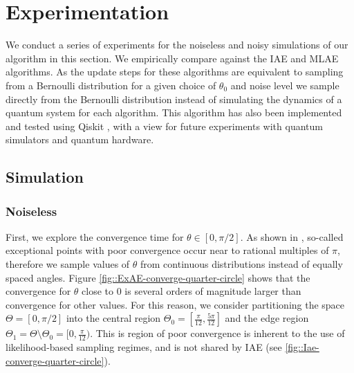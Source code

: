 \section{Experimentation}
We conduct a series of experiments for the noiseless and noisy simulations of our algorithm in this section. We empirically compare against the IAE and MLAE algorithms. As the update steps for these algorithms are equivalent to sampling from a Bernoulli distribution for a given choice of $\theta_0$ and noise level we sample directly from the Bernoulli distribution instead of simulating the dynamics of a quantum system for each algorithm. This algorithm has also been implemented and tested using Qiskit \cite{Qiskit}, with a view for future experiments with quantum simulators and quantum hardware.


\subsection{Simulation}
\subsubsection{Noiseless}
First, we explore the convergence time for $\theta \in [0, \pi/2]$. As shown in \cite{callison_2022_amp_with_jitter}, so-called exceptional points with poor convergence occur near to rational multiples of $\pi$, therefore we sample values of $\theta$ from continuous distributions instead of equally spaced angles. Figure \ref{fig::ExAE-converge-quarter-circle} shows that the convergence for $\theta$ close to $0$ is several orders of magnitude larger than convergence for other values. For this reason, we consider partitioning the space $\Theta = [0, \pi/2]$ into the central region $\Theta_0 = [\frac{\pi}{12}, \frac{5 \pi}{12}]$ and the edge region $\Theta_1 = \Theta \setminus \Theta_0 = [0, \frac{\pi}{12})$. This is region of poor convergence is inherent to the use of likelihood-based sampling regimes, and is not shared by IAE (see \ref{fig::Iae-converge-quarter-circle}).

